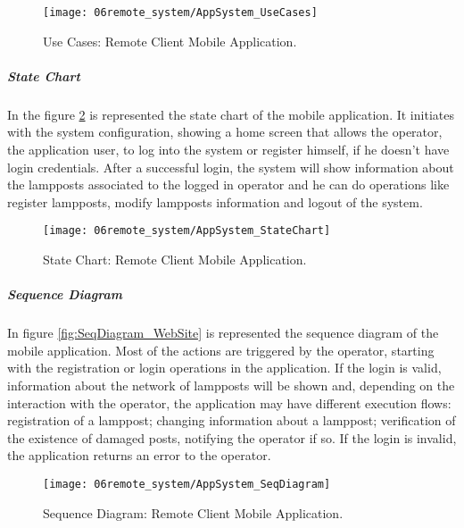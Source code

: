 \begin{figure}[H]
	\centering
	\texttt{[image: 06remote\_system/AppSystem\_UseCases]}
	\caption{Use Cases: Remote Client Mobile Application.}
	\label{fig:UseCases_application}
\end{figure}

\subparagraph*{State Chart}
In the figure \ref{fig:StateChart_application} is represented the state chart of the mobile application. It initiates with the system configuration, showing a home screen that allows the operator, the application user, to log into the system or register himself, if he doesn’t have login credentials. After a successful login, the system will show information about the lampposts associated to the logged in operator and he can do operations like register lampposts, modify lampposts information and logout of the system.

\begin{figure}[H]
	\centering
	\texttt{[image: 06remote\_system/AppSystem\_StateChart]}
	\caption{State Chart: Remote Client Mobile Application.}
	\label{fig:StateChart_application}
\end{figure}


\subparagraph*{Sequence Diagram}
In figure \ref{fig:SeqDiagram_WebSite} is represented the sequence diagram of the mobile application. Most of the actions are triggered by the operator, starting with the registration or login operations in the application. If the login is valid, information about the network of lampposts will be shown and, depending on the interaction with the operator, the application may have different execution flows: registration of a lamppost; changing information about a lamppost; verification of the existence of damaged posts, notifying the operator if so. If the login is invalid, the application returns an error to the operator.

\begin{figure}[H]
	\centering
	\texttt{[image: 06remote\_system/AppSystem\_SeqDiagram]}
	\caption{Sequence Diagram: Remote Client Mobile Application.}
	\label{fig:SeqDiagram_application}
\end{figure}
